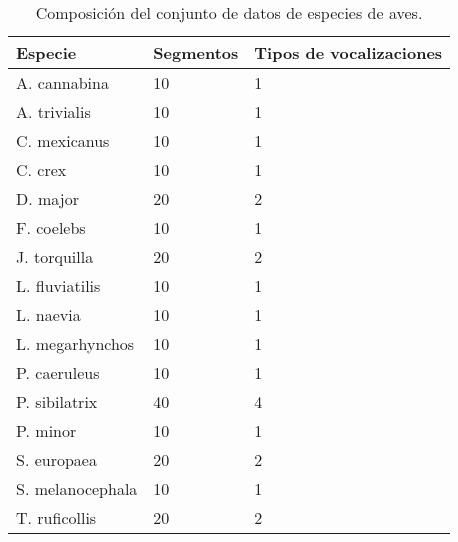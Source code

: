 \begin{table}[h]
    \centering
    \begin{tabular}{lll}
        \hline
        Especie & Segmentos & Tipos de vocalizaciones   \\ \hline
        A. cannabina & 10 & 1                           \\
        A. trivialis & 10 & 1                           \\
        C. mexicanus & 10 & 1                           \\
        C. crex & 10 & 1                                \\
        D. major & 20 & 2                               \\
        F. coelebs & 10 & 1                             \\
        J. torquilla & 20 & 2                           \\
        L. fluviatilis & 10 & 1                         \\
        L. naevia & 10 & 1                              \\
        L. megarhynchos & 10 & 1                        \\
        P. caeruleus & 10 & 1                           \\
        P. sibilatrix & 40 & 4                          \\
        P. minor & 10 & 1                               \\
        S. europaea & 20 & 2                            \\
        S. melanocephala & 10 & 1                       \\
        T. ruficollis & 20 & 2
    \end{tabular}
    \caption{Composición del conjunto de datos de especies de aves.}
    \label{table:birds}
\end{table}

